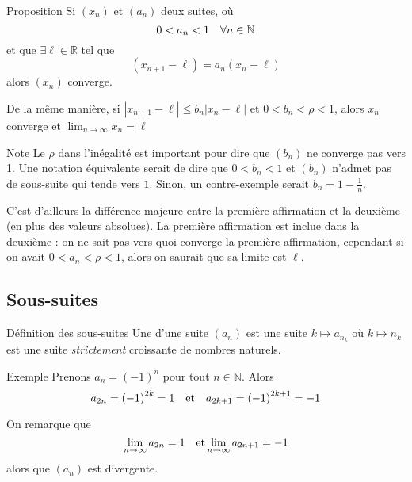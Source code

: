 \documentclass[a4paper]{article}
\begin{document}
\begin{parag}{Proposition}
    Si $\left(x_n\right)$ et $\left(a_n\right)$ deux suites, où
    \[0 < a_n < 1 \quad \forall n \in \mathbb{N}\]
    et que $\exists \ell \in \mathbb{R}$ tel que
    \[\left(x_{n+1} - \ell\right) = a_n \left(x_n - \ell\right)\]
    alors $\left(x_n\right)$ converge.

    De la même manière, si $\left|x_{n+1} - \ell\right| \leq b_n \left|x_n - \ell\right|$ et $0 < b_n < \rho < 1$, alors $x_n$ converge et $\lim_{n \to \infty} x_n = \ell$

    \begin{subparag}{Note}
        Le $\rho$ dans l'inégalité est important pour dire que $\left(b_n\right)$ ne converge pas vers 1. Une notation équivalente serait de dire que $0 < b_n < 1$ et $\left(b_n\right)$ n'admet pas de sous-suite qui tende vers $1$. Sinon, un contre-exemple serait $b_n = 1 - \frac{1}{n}$.

        C'est d'ailleurs la différence majeure entre la première affirmation et la deuxième (en plus des valeurs absolues). La première affirmation est inclue dans la deuxième : on ne sait pas vers quoi converge la première affirmation, cependant si on avait $0 < a_n < \rho < 1$, alors on saurait que sa limite est $\ell$.
    \end{subparag}
\end{parag}

\subsection{Sous-suites}
\begin{parag}{Définition des sous-suites}
    Une  d'une suite $\left(a_n\right)$ est une suite $k \mapsto a_{n_k}$ où $k \mapsto n_k$ est une suite \emph{strictement} croissante de nombres naturels.
\end{parag}

\begin{parag}{Exemple}
    Prenons $a_n = \left(-1\right)^{n}$ pour tout $n \in \mathbb{N}$. Alors
    \[a_{2n} = \left(-1\right)^{2k} = 1 \mathspace \text{et} \mathspace a_{2k+1} = \left(-1\right)^{2k+1} = -1\]

    On remarque que
    \[\lim_{n \to \infty} a_{2n} = 1 \quad \text{et} \lim_{n \to \infty} a_{2n+1} = -1\]
    alors que $\left(a_n\right)$ est divergente.
\end{parag}
\end{document}
